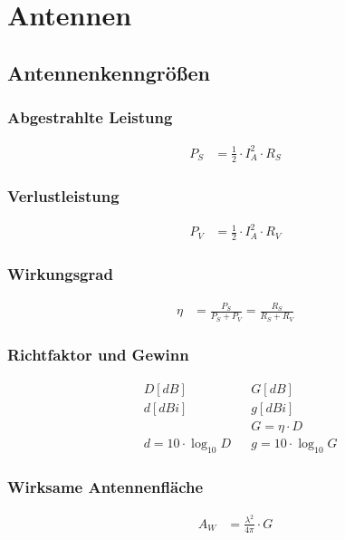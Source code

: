 \section{Antennen}

\subsection{Antennenkenngrößen}



\subsubsection{Abgestrahlte Leistung}
\begin{align*}
    P_S & = \frac{1}{2}\cdot I_A^2 \cdot R_S
\end{align*}

\subsubsection{Verlustleistung}
\begin{align*}
    P_V & = \frac{1}{2}\cdot I_A^2\cdot R_V
\end{align*}

\subsubsection{Wirkungsgrad}
\begin{align*}
    \eta & = \frac{P_S}{P_S + P_V} = \frac{R_S}{R_S + R_V}
\end{align*}

\subsubsection{Richtfaktor und Gewinn}
\begin{align*}
     & D\left[\si{dB}\right]  &  & G\left[\si{dB}\right]  \\
     & d\left[\si{dBi}\right] &  & g\left[\si{dBi}\right] \\
     &                        &  & G  = \eta\cdot D       \\
     & d = 10\cdot\log_{10} D &  & g  = 10\cdot\log_{10}G
\end{align*}

\subsubsection{Wirksame Antennenfläche}
\begin{align*}
    A_W & = \frac{\lambda^2}{4\pi}\cdot G
\end{align*}


